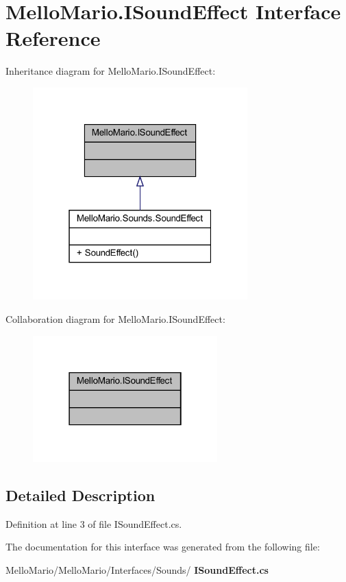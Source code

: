 \section{Mello\+Mario.\+I\+Sound\+Effect Interface Reference}
\label{interfaceMelloMario_1_1ISoundEffect}


Inheritance diagram for Mello\+Mario.\+I\+Sound\+Effect\+:
\nopagebreak
\begin{figure}[H]
\begin{center}
\leavevmode
\includegraphics[width=235pt]{interfaceMelloMario_1_1ISoundEffect__inherit__graph}
\end{center}
\end{figure}


Collaboration diagram for Mello\+Mario.\+I\+Sound\+Effect\+:
\nopagebreak
\begin{figure}[H]
\begin{center}
\leavevmode
\includegraphics[width=202pt]{interfaceMelloMario_1_1ISoundEffect__coll__graph}
\end{center}
\end{figure}


\subsection{Detailed Description}


Definition at line 3 of file I\+Sound\+Effect.\+cs.



The documentation for this interface was generated from the following file\+:\begin{DoxyCompactItemize}
\item 
Mello\+Mario/\+Mello\+Mario/\+Interfaces/\+Sounds/\textbf{ I\+Sound\+Effect.\+cs}\end{DoxyCompactItemize}
